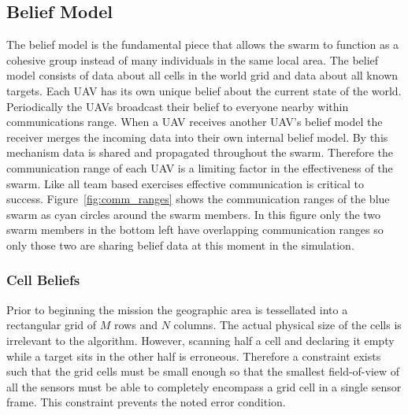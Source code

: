 \subsection{Belief Model}
\label{sec:uavBelief}
The belief model is the fundamental piece that allows the swarm to function as a cohesive group instead of many individuals in the same local area.  The belief model consists of data about all cells in the world grid and data about all known targets.  Each UAV has its own unique belief about the current state of the world.  Periodically the UAVs broadcast their belief to everyone nearby within communications range.  When a UAV receives another UAV's belief model the receiver merges the incoming data into their own internal belief model.  By this mechanism data is shared and propagated throughout the swarm.  Therefore the communication range of each UAV is a limiting factor in the effectiveness of the swarm.  Like all team based exercises effective communication is critical to success.  Figure~\ref{fig:comm_ranges} shows the communication ranges of the blue swarm as cyan circles around the swarm members.  In this figure only the two swarm members in the bottom left have overlapping communication ranges so only those two are sharing belief data at this moment in the simulation.



\subsubsection{Cell Beliefs}
Prior to beginning the mission the geographic area is tessellated into a rectangular grid of $M$ rows and $N$ columns.  The actual physical size of the cells is irrelevant to the algorithm.  However, scanning half a cell and declaring it empty while a target sits in the other half is erroneous.  Therefore a constraint exists such that the grid cells must be small enough so that the smallest field-of-view of all the sensors must be able to completely encompass a grid cell in a single sensor frame.  This constraint prevents the noted error condition.

